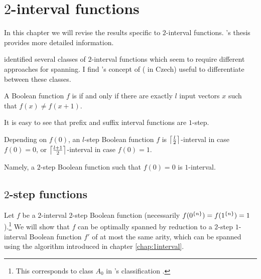\chapter{\texorpdfstring{$2$}{2}-interval functions}

In this chapter we will revise the results specific to
$2$-interval functions.
\dubovsky{}'s
thesis \cite{Dubovsky2012}
provides more detailed information.

\dubovsky{} identified several classes
of $2$-interval functions \cite[p.~5]{Dubovsky2012}
which seem to require different approaches for spanning.
I find \husek{}'s concept of
 \cite[p.~13]{Husek2014}
( in Czech)
useful to differentiate between these classes.

\begin{definition}
A Boolean function $f$ is 
if and only if
there are exactly $l$ input vectors $x$ such that
$f(x) \neq f(x+1)$.
\end{definition}

It is easy to see that
prefix and suffix interval functions are $1$-step.

Depending on $f(0)$,
an $l$-step Boolean function $f$
is $\ceil*{\frac{l}{2}}$-interval in case $f(0) = 0$,
or $\ceil*{\frac{l+1}{2}}$-interval in case $f(0) = 1$.

Namely,
a $2$-step Boolean function such that $f(0) = 0$
is $1$-interval.

\section{\texorpdfstring{$2$}{2}-step functions}

\newcommand{\ftwointtwostep}[4]
{#1^{#2}_{\interval{\rep{0}{#2}}{#3},
\interval{#4}{\rep{1}{#2}}}}

\newcommand{\fnba}{\ftwointtwostep{f}{n}{b_1}{a_2}}

Let $f$ be a $2$-interval $2$-step Boolean function
(necessarily $f(\rep{0}{n}) = f(\rep{1}{n})
= 1$).\footnote{This corresponds to class $A_0$
in \dubovsky{}'s classification
\cite[p.~5]{Dubovsky2012}.}
We will show that $f$
can be optimally spanned by reduction to
a $2$-step $1$-interval Boolean function $f'$
of at most the same arity,
which can be spanned using the algorithm introduced
in chapter \ref{chap:1interval}.

